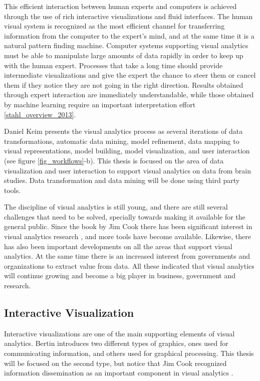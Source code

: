 This efficient interaction between human experts and computers is achieved through the use of rich interactive visualizations and fluid interfaces. The human visual system is recognized as the most efficient channel for transferring information from the computer to the expert's mind, and at the same time it is a natural pattern finding machine. Computer systems supporting visual analytics must be able to manipulate large amounts of data rapidly in order to keep up with the human expert. Processes that take a long time should provide intermediate visualizations and give the expert the chance to steer them or cancel them if they notice they are not going in the right direction. Results obtained through expert interaction are immediately understandable, while those obtained by machine learning require an important interpretation effort \ref{stahl_overview_2013}.

Daniel Keim presents the visual analytics process as several iterations of data transformations, automatic data mining, model refinement, data mapping to visual representations, model building, model visualization, and user interaction \autocite{keim_mastering_2010} (see figure \ref{fig_workflows}-b). This thesis is focused on the area of data visualization and user interaction to support visual analytics on data from brain studies. Data transformation and data mining will be done using third party tools.

The discipline of visual analytics is still young, and there are still several challenges that need to be solved, specially towards making it available for the general public\autocite{kwon_visual_2011}. Since the book by Jim Cook there has been significant interest in visual analytics research \autocite{chen_illuminated_2012}, and more tools have become available. Likewise, there has also been important developments on all the areas that support visual analytics. At the same time there is an increased interest from governments and organizations to extract value from data. All these indicated that visual analytics will continue growing and become a big player in business, government and research.


\subsection{Interactive Visualization}

Interactive visualizations are one of the main supporting elements of visual analytics. Bertin 
\autocite{bertin_graphics_1981} introduces two different types of graphics, ones used for communicating information, and others used for graphical processing. This thesis will be focused on the second type, but notice that Jim Cook recognized information dissemination as an important component in visual analytics \autocite{cook_illuminating_2005}.


